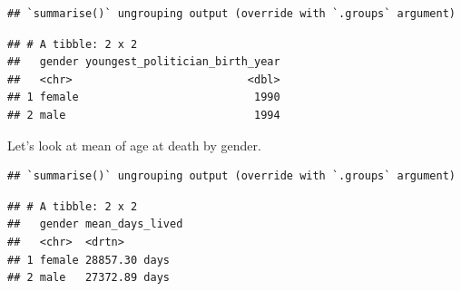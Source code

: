 \documentclass[
]{book}
\newenvironment{Shaded}{\begin{snugshade}}{\end{snugshade}}
\newcommand{\DataTypeTok}[1]{\textcolor[rgb]{0.13,0.29,0.53}{#1}}
\newcommand{\DecValTok}[1]{\textcolor[rgb]{0.00,0.00,0.81}{#1}}
\newcommand{\KeywordTok}[1]{\textcolor[rgb]{0.13,0.29,0.53}{\textbf{#1}}}
\newcommand{\NormalTok}[1]{#1}
\newcommand{\OperatorTok}[1]{\textcolor[rgb]{0.81,0.36,0.00}{\textbf{#1}}}
\newcommand{\OtherTok}[1]{\textcolor[rgb]{0.56,0.35,0.01}{#1}}
\newcommand{\StringTok}[1]{\textcolor[rgb]{0.31,0.60,0.02}{#1}}
\begin{document}
\begin{Shaded}
\end{Shaded}

\begin{verbatim}
## `summarise()` ungrouping output (override with `.groups` argument)
\end{verbatim}

\begin{verbatim}
## # A tibble: 2 x 2
##   gender youngest_politician_birth_year
##   <chr>                           <dbl>
## 1 female                           1990
## 2 male                             1994
\end{verbatim}

Let's look at mean of age at death by gender.

\begin{Shaded}
\end{Shaded}

\begin{verbatim}
## `summarise()` ungrouping output (override with `.groups` argument)
\end{verbatim}

\begin{verbatim}
## # A tibble: 2 x 2
##   gender mean_days_lived
##   <chr>  <drtn>         
## 1 female 28857.30 days  
## 2 male   27372.89 days
\end{verbatim}
\end{document}
